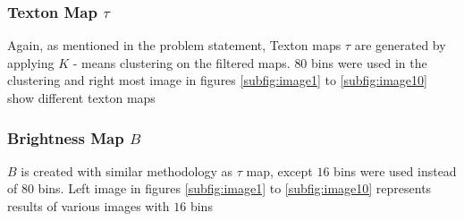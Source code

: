 \documentclass[conference]{IEEEtran}
\begin{document}
		\subsubsection{Texton Map $\tau$}
		Again, as mentioned in the problem statement, Texton maps $\tau$ are generated by applying $K$ - means clustering on the filtered maps. $80$ bins were used in the clustering and right most image in figures \ref{subfig:image1} to \ref{subfig:image10} show different texton maps  
		\vspace{0.2cm}
		\subsubsection{Brightness Map $B$}
		$B$ is created with similar methodology as $\tau$ map, except $16$ bins were used instead of $80$ bins. Left image in figures \ref{subfig:image1} to \ref{subfig:image10} represents results of various images with $16$ bins
		\vspace{0.2cm}
\end{document}
